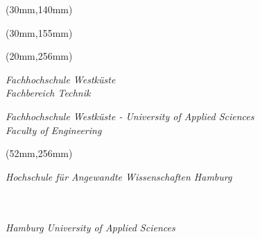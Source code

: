\begin{titlepage}
{%
\begin{textblock*}{\textwidth}(30mm,140mm)
  \begin{minipage}[b][0cm][b]{\textwidth}
  \fontsize{14pt}{20pt}
  \selectfont
    \begin{flushright}
      \IthesisAuthor
  	\end{flushright}
  \end{minipage}
\end{textblock*}

\begin{textblock*}{\textwidth}(30mm,155mm)
  \begin{minipage}[b][0cm][t]{\textwidth}
  \fontsize{18pt}{20pt}
  \selectfont
  	\begin{flushright}
       \IthesisTitle
  	\end{flushright}
  \end{minipage}
\end{textblock*}

\begin{textblock*}{\textwidth}(20mm,256mm)
  \begin{minipage}[b][0cm][t]{\textwidth}
  \fontsize{11pt}{10pt}
  \selectfont
    \begin{flushleft}
      \footnotesize{
        \textit{Fachhochschule Westküste} \\
        \textit{Fachbereich Technik} \\

        \bigskip
        \bigskip

        \textit{Fachhochschule Westküste - University of Applied Sciences}\\
        \textit{Faculty of Engineering}
      }
    \end{flushleft}
  \end{minipage}
\end{textblock*}

\begin{textblock*}{\textwidth}(52mm,256mm)
  \begin{minipage}[b][0cm][t]{\textwidth}
  \fontsize{11pt}{10pt}
  \selectfont
    \begin{flushright}
      \footnotesize{
        \textit{Hochschule für Angewandte Wissenschaften Hamburg} \\
        \textit{\IthesisFacultyFull} \\
        \textit{\IthesisDepartmentFull} \\

        \bigskip

        \textit{Hamburg University of Applied Sciences} \\
        \textit{\IthesisFacultyFullEN} \\
        \textit{\IthesisDepartmentFullEN}
      }
    \end{flushright}
  \end{minipage}
\end{textblock*}
}
\end{titlepage}
\                %
